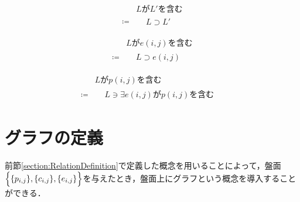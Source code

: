\begin{definition}\textup{}

  \begin{equation}
    \begin{aligned}
                & LがL'を含む \\
      \coloneqq &
      \begin{aligned}
         & L\supset L' &
      \end{aligned}
    \end{aligned}
  \end{equation}

  \begin{equation}
    \begin{aligned}
                & Lがe(i,j)を含む \\
      \coloneqq &
      \begin{aligned}
         & L\supset  e(i,j) &
      \end{aligned}
    \end{aligned}
  \end{equation}

  \begin{equation}
    \begin{aligned}
                & Lがp(i,j)を含む \\
      \coloneqq &
      \begin{aligned}
         & L\ni \exists e(i,j)がp(i,j)を含む &
      \end{aligned}
    \end{aligned}
  \end{equation}


\end{definition}


\section{グラフの定義}\label{section:GraphDefinition}
前節\ref{section:RelationDefinition}で定義した概念を用いることによって，盤面$\Bigl\{\{p_{i,j}\},\{c_{i,j}\},\{e_{i,j}\}\Bigr\}$を与えたとき，盤面上にグラフという概念を導入することができる．

